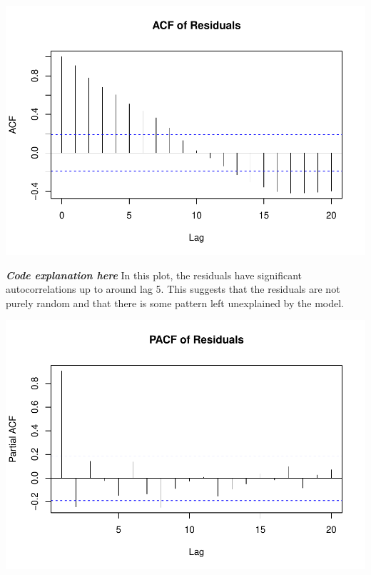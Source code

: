 \documentclass[
]{book}
\newenvironment{Shaded}{\begin{snugshade}}{\end{snugshade}}
\newcommand{\AttributeTok}[1]{\textcolor[rgb]{0.13,0.29,0.53}{#1}}
\newcommand{\FunctionTok}[1]{\textcolor[rgb]{0.13,0.29,0.53}{\textbf{#1}}}
\newcommand{\NormalTok}[1]{#1}
\newcommand{\SpecialCharTok}[1]{\textcolor[rgb]{0.81,0.36,0.00}{\textbf{#1}}}
\newcommand{\StringTok}[1]{\textcolor[rgb]{0.31,0.60,0.02}{#1}}
\begin{document}
\begin{Shaded}
\end{Shaded}

\includegraphics{bookdown-demo_files/figure-latex/unnamed-chunk-26-1.pdf}

\emph{\textbf{Code explanation here}}
In this plot, the residuals have significant autocorrelations up to around lag 5. This suggests that the residuals are not purely random and that there is some pattern left unexplained by the model.

\begin{Shaded}
\end{Shaded}

\includegraphics{bookdown-demo_files/figure-latex/unnamed-chunk-27-1.pdf}
\end{document}
